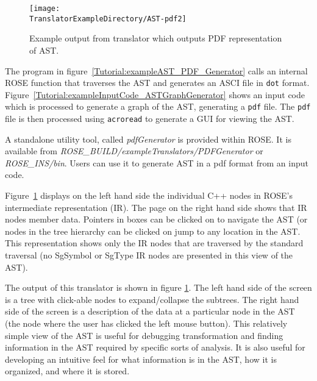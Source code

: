 \begin{figure}
\texttt{[image: \\TranslatorExampleDirectory/AST-pdf2]}
\caption{Example output from translator which outputs PDF representation of AST.}
\label{tutorial:exampleOutputCodePDF}
\end{figure}

The program in figure~\ref{Tutorial:exampleAST_PDF_Generator} calls 
an internal ROSE function that traverses the AST and generates 
an ASCI file in {\tt dot} format.
Figure~\ref{Tutorial:exampleInputCode_ASTGraphGenerator} shows an input
code which is processed to generate a graph of the AST, generating a 
{\tt pdf} file.   The {\tt pdf} file is then processed
using {\tt acroread} to generate a GUI for viewing the AST.

A standalone utility tool, called \textit{pdfGenerator} is provided within
ROSE. It is available from
\textit{ROSE\_BUILD/exampleTranslators/PDFGenerator} or
\textit{ROSE\_INS/bin}. Users can use it to generate AST in a pdf format
from an input code.

   Figure~\ref{tutorial:exampleOutputCodePDF} displays on the left hand side the individual
C++ nodes in ROSE's intermediate representation (IR).  The page on the right hand side
shows that IR nodes member data. Pointers in boxes can be clicked on to navigate the AST
(or nodes in the tree hierarchy can be clicked on jump to any location in the AST.
This representation shows only the IR nodes that are traversed by the standard traversal
(no SgSymbol or SgType IR nodes are presented in this view of the AST).

The output of this translator is shown in figure \ref{tutorial:exampleOutputCodePDF}.  The left hand side
of the screen is a tree with click-able nodes to expand/collapse the subtrees.
The right hand side of the screen is a description of the data at a particular 
node in the AST (the node where the user has clicked the left mouse button).
This relatively simple view of the AST is useful for debugging transformation and finding
information in the AST required by specific sorts of analysis.  It is also useful
for developing an intuitive feel for what information is in the AST, how it is organized, 
and where it is stored.

